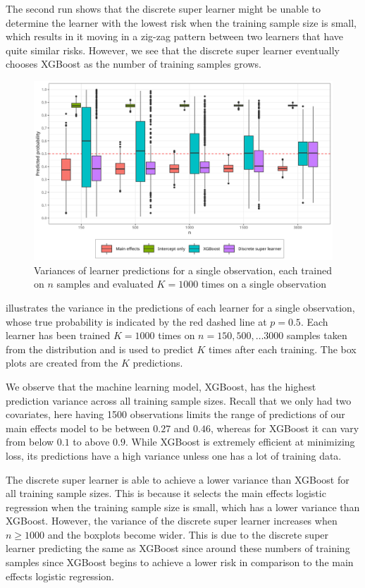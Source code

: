 \documentclass[./main.tex]{subfiles}
\begin{document}
The second run shows that the discrete super learner might be unable to determine the learner with the lowest risk when the training sample size is small, which results in it moving in a zig-zag pattern between two learners that have quite similar risks. However, we see that the discrete super learner eventually chooses XGBoost as the number of training samples grows.  

\begin{figure}[H]
    \centering
    \includegraphics[width=\textwidth]{figures/learner_vars.png}
    \caption{Variances of learner predictions for a single observation, each trained on $n$ samples and evaluated $ K = 1000 $ times on a single observation}
    \label{fig:pred_probs_boxplot}
\end{figure}
 illustrates the variance in the predictions of each learner for a single observation, whose true probability is indicated by the red dashed line at $ p = 0.5 $. Each learner has been trained $ K = 1000 $ times on $ n = 150, 500, \dots 3000 $ samples taken from the distribution and is used to predict $ K $ times after each training. The box plots are created from the $ K $ predictions. 

We observe that the machine learning model, XGBoost, has the highest prediction variance across all training sample sizes. Recall that we only had two covariates, here having 1500 observations limits the range of predictions of our main effects model to be between $ 0.27 $ and $ 0.46 $, whereas for XGBoost it can vary from below $ 0.1 $ to above $ 0.9 $. While XGBoost is extremely efficient at minimizing loss, its predictions have a high variance unless one has a lot of training data. 

The discrete super learner is able to achieve a lower variance than XGBoost for all training sample sizes. This is because it selects the main effects logistic regression when the training sample size is small, which has a lower variance than XGBoost. However, the variance of the discrete super learner increases when $ n \geq 1000 $ and the boxplots become wider. This is due to the discrete super learner predicting the same as XGBoost since around these numbers of training samples since XGBoost begins to achieve a lower risk in comparison to the main effects logistic regression. 
\end{document}
